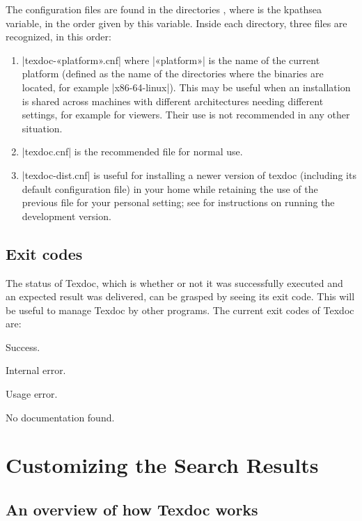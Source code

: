 \documentclass[draft]{texdoc-doc}
\begin{document}
The configuration files are found in the directories , where
 is the kpathsea variable, in the order given by this variable.
Inside each directory, three files are recognized, in this order:
%
\begin{enumerate}
\item |texdoc-«platform».cnf| where |«platform»| is the name of the current
  platform (defined as the name of the directories where the {\TL}
  binaries are located, for example |x86-64-linux|). This may be useful when
  an installation is shared across machines with different architectures
  needing different settings, for example for viewers. Their use is not
  recommended in any other situation.
\item |texdoc.cnf| is the recommended file for normal use.
\item |texdoc-dist.cnf| is useful for installing a newer version of texdoc
  (including its default configuration file) in your home while retaining
  the use of the previous file for your personal setting; see
  {\TexdocRepo} for instructions on running the development version.
\end{enumerate}

\subsection{Exit codes}
\label{sec:exit}

The status of Texdoc, which is whether or not it was successfully executed and
an expected result was delivered, can be grasped by seeing its exit code. This
will be useful to manage Texdoc by other programs. The current exit codes of
Texdoc are:
%
\begin{description}[left=2em]
\item[\code{0}] Success.
\item[\code{1}] Internal error.
\item[\code{2}] Usage error.
\item[\code{3}] No documentation found.
\end{description}

\section{Customizing the Search Results}

\subsection{An overview of how Texdoc works}
\end{document}
